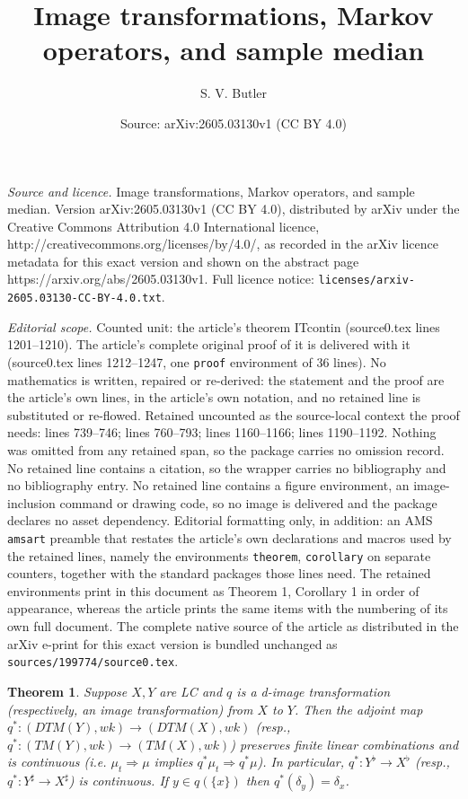 \documentclass[10pt,a4paper]{amsart}
\title{Image transformations, Markov operators, and sample median}
\author{S. V. Butler}
\date{Source: arXiv:2605.03130v1 (CC BY 4.0)}
\newtheorem{theorem}{Theorem}
\begin{document}
\maketitle

\noindent\emph{Source and licence.} Image transformations, Markov operators, and sample median. Version arXiv:2605.03130v1 (CC BY 4.0), distributed by arXiv under the Creative Commons Attribution 4.0 International licence, http://creativecommons.org/licenses/by/4.0/, as recorded in the arXiv licence metadata for this exact version and shown on the abstract page https://arxiv.org/abs/2605.03130v1. Full licence notice: \texttt{licenses/arxiv-2605.03130-CC-BY-4.0.txt}.\par\smallskip

\noindent\textit{Editorial scope.} Counted unit: the article's theorem ITcontin (source0.tex lines 1201--1210). The article's complete original proof of it is delivered with it (source0.tex lines 1212--1247, one \texttt{proof} environment of 36 lines). No mathematics is written, repaired or re-derived: the statement and the proof are the article's own lines, in the article's own notation, and no retained line is substituted or re-flowed.  Retained uncounted as the source-local context the proof needs: lines 739--746; lines 760--793; lines 1160--1166; lines 1190--1192.  Nothing was omitted from any retained span, so the package carries no omission record.  No retained line contains a citation, so the wrapper carries no bibliography and no bibliography entry.  No retained line contains a figure environment, an image-inclusion command or drawing code, so no image is delivered and the package declares no asset dependency.  Editorial formatting only, in addition: an AMS \texttt{amsart} preamble that restates the article's own declarations and macros used by the retained lines, namely the environments \texttt{theorem}, \texttt{corollary} on separate counters, together with the standard packages those lines need.  The retained environments print in this document as Theorem 1, Corollary 1 in order of appearance, whereas the article prints the same items with the numbering of its own full document.  The complete native source of the article as distributed in the arXiv e-print for this exact version is bundled unchanged as \texttt{sources/199774/source0.tex}.
\begin{theorem} \label{adjCont}
Suppose $X,Y$ are LC and $q$ is a d-image transformation (respectively, an image transformation) from $X$ to $Y$.
Then the adjoint map $q^* : (DTM(Y), wk) \rightarrow (DTM(X), wk) $ (resp.,  $q^* : (TM(Y), wk) \rightarrow (TM(X), wk) $) 
preserves finite linear combinations and  
is continuous (i.e. $ \mu_t \Longrightarrow \mu$ implies $q^* \mu_t \Longrightarrow  q^*\mu$).
In particular,  $q^* :Y^{\flat} \rightarrow X^{\flat}$ (resp.,  $q^* :Y^\sharp \rightarrow X^\sharp$)  is continuous.
If $y \in q(\{ x\})$ then $q^*(\delta_y) = \delta_x$.
\end{theorem}
\end{document}
